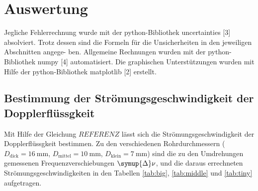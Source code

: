 \section{Auswertung}
\label{sec:Auswertung}
Jegliche Fehlerrechnung wurde mit der python-Bibliothek uncertainties [3] absolviert.
Trotz dessen sind die Formeln für die Unsicherheiten in den jeweiligen Abschnitten angege-
ben. Allgemeine Rechnungen wurden mit der python-Bibliothek numpy [4] automatisiert.
Die graphischen Unterstützungen wurden mit Hilfe der python-Bibliothek matplotlib [2]
erstellt.
\subsection{Bestimmung der Strömungsgeschwindigkeit der Dopplerflüssgkeit}
Mit Hilfe der Gleichung $REFERENZ$ lässt sich die Strömungsgeschwindigkeit der Dopplerflüssgkeit bestimmen.
Zu den verschiedenen Rohrdurchmessern ($D_\text{dick} = \SI{16}{\milli\metre}$, $D_\text{mittel} = \SI{10}{\milli\metre}$,
$D_\text{klein} = \SI{7}{\milli\metre}$) sind die zu den Umdrehungen gemessenen Frequenzverschiebungen $\symup{\Delta} \nu$,
und die daraus errechneten Strömungsgeschwindigkeiten  in den Tabellen \ref{tab:big}, \ref{tab:middle} und \ref{tab:tiny} aufgetragen.

